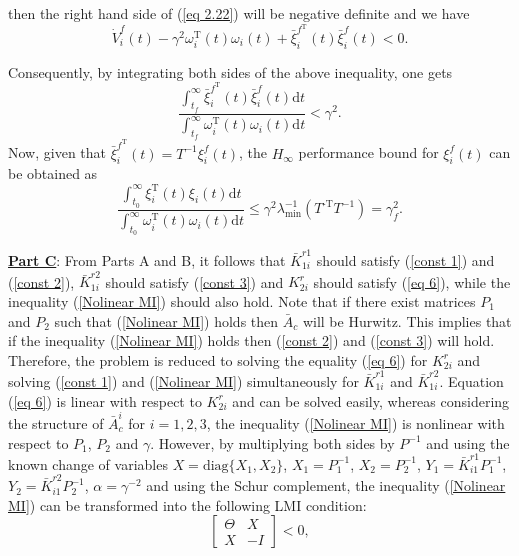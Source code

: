\documentclass[12pt,draftcls,onecolumn]{IEEEtran}
\begin{document}
 then  the right hand side of (\ref{eq 2.22}) will be negative definite and we have 
$$\dot V_i^f(t)-\gamma^{2}\omega_i^{\text{T}}(t)\omega_i(t)+\bar \xi_i^{f^\text{T}}(t)\bar \xi_i^f(t)<0.$$\par
Consequently, by integrating both sides of the above inequality, one gets
$$\frac{\int_{t_f}^{\infty}\bar \xi_i^{f^\text{T}}(t)\bar \xi_i^f(t)\text{d}t}{\int_{t_f}^{\infty} \omega_i^{\text{T}}(t)\omega_i(t)\text{d}t}<\gamma^2.$$
Now, given that $\bar \xi_i^{f^\text{T}}(t)=T^{-1}\xi_i^f(t)$, the $H_{\infty}$ performance  bound for  $\xi_i^f(t)$ can be obtained as 
  \begin{equation*}
 \frac{\int_{t_0}^{\infty} \xi_i^{\text{T}}(t) \xi_i(t)\text{d}t}{\int_{t_0}^{\infty}\omega_i^{\text{T}}(t)\omega_i(t)\text{d}t}\leq \gamma^2\lambda_{\text{min}}^{-1}(T^{\text{-T}}T^{-1})=\gamma^2_f.
 \end{equation*}\par
\underline{\textbf{Part C}}: From Parts A and B, it follows that $\bar K_{1i}^{r1}$ should satisfy (\ref{const 1}) and (\ref{const 2}),  $\bar K_{1i}^{r2}$ should satisfy (\ref{const 3}) and $ K_{2i}^r$ should  satisfy (\ref{eq 6}), while the inequality (\ref{Nolinear MI}) should also hold. Note that if there exist matrices $P_1$ and $P_2$ such that (\ref{Nolinear MI}) holds then $\bar A_c$ will be Hurwitz. This implies that if the inequality (\ref{Nolinear MI}) holds then  (\ref{const 2}) and (\ref{const 3}) will hold. Therefore, the problem is reduced to solving the equality (\ref{eq 6}) for  $ K_{2i}^r$ and solving (\ref{const 1})  and (\ref{Nolinear MI}) simultaneously for  $\bar K_{1i}^{r1}$ and $\bar K_{1i}^{r2}$. Equation (\ref{eq 6}) is linear with respect to $ K_{2i}^r$ and can be solved easily,
whereas considering the structure of $\bar A_{c}^i$ for $i=1,2,3$, the inequality (\ref{Nolinear MI}) is nonlinear with respect to $P_1$, $P_2$ and $\gamma$. However, by multiplying both sides by $P^{-1}$ and using the known change of variables $X=\text{diag}\{X_1,X_2\}$, $X_1=P_1^{-1}$, $X_2=P_2^{-1}$, $Y_1=\bar K_{i1}^{r1}P_1^{-1}$, $Y_2=\bar K_{i1}^{r2}P_2^{-1}$, $\alpha=\gamma^{-2}$ and using the Schur complement, the  inequality (\ref{Nolinear MI}) can be transformed into the following LMI condition:
\begin{equation}
\begin{bmatrix}
\Theta&X\\
X&-I
\end{bmatrix}
<0,\label{faulty agent performance index constraint}
\end{equation}
\end{document}
